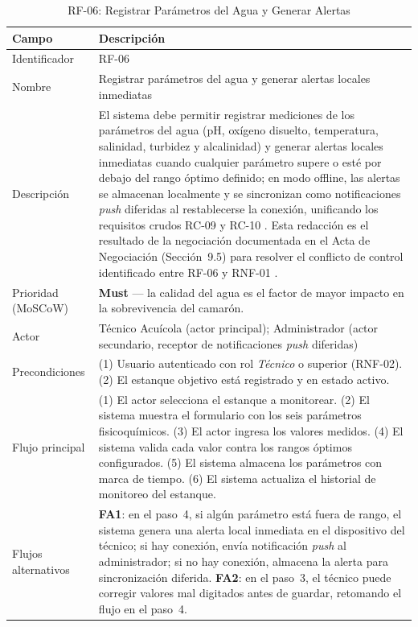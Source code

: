 \documentclass[12pt,a4paper]{article}
\begin{document}
\begin{longtable}{|p{3.6cm}|p{10.4cm}|}
\caption{RF-06: Registrar Parámetros del Agua y Generar Alertas}
\label{tab:rf06}\\
\hline
\textbf{Campo} & \textbf{Descripción} \\
\hline
\endfirsthead
Identificador & RF-06 \\ \hline
Nombre & Registrar parámetros del agua y generar alertas locales inmediatas \\ \hline
Descripción & El sistema debe permitir registrar mediciones de los parámetros
del agua (pH, oxígeno disuelto, temperatura, salinidad, turbidez y
alcalinidad) y generar alertas locales inmediatas cuando cualquier parámetro
supere o esté por debajo del rango óptimo definido; en modo offline, las
alertas se almacenan localmente y se sincronizan como notificaciones
\textit{push} diferidas al restablecerse la conexión, unificando los
requisitos crudos RC-09 y RC-10 \cite{ISO29148:2018}. Esta redacción es el
resultado de la negociación documentada en el Acta de Negociación
(Sección~9.5) para resolver el conflicto de control identificado entre RF-06 y
RNF-01 \cite{Pohl2010}. \\ \hline
Prioridad (MoSCoW) & \textbf{Must} --- la calidad del agua es el factor de
mayor impacto en la sobrevivencia del camarón. \\ \hline
Actor & Técnico Acuícola (actor principal); Administrador (actor secundario,
receptor de notificaciones \textit{push} diferidas) \\ \hline
Precondiciones & (1) Usuario autenticado con rol \textit{Técnico} o superior
(RNF-02). (2) El estanque objetivo está registrado y en estado activo. \\ \hline
Flujo principal &
(1) El actor selecciona el estanque a monitorear.
(2) El sistema muestra el formulario con los seis parámetros fisicoquímicos.
(3) El actor ingresa los valores medidos.
(4) El sistema valida cada valor contra los rangos óptimos configurados.
(5) El sistema almacena los parámetros con marca de tiempo.
(6) El sistema actualiza el historial de monitoreo del estanque. \\ \hline
Flujos alternativos & \textbf{FA1}: en el paso~4, si algún parámetro está
fuera de rango, el sistema genera una alerta local inmediata en el dispositivo
del técnico; si hay conexión, envía notificación \textit{push} al
administrador; si no hay conexión, almacena la alerta para sincronización
diferida. \textbf{FA2}: en el paso~3, el técnico puede corregir valores mal
digitados antes de guardar, retomando el flujo en el paso~4. \\ \hline

\end{longtable}
\end{document}
